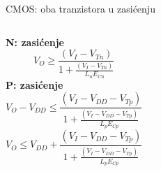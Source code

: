 \begin{frame}[label=09_2-s029]{CMOS: oba tranzistora u zasićenju}
\begin{columns}[T,onlytextwidth]\centering {}\textbf{N: zasićenje}\[ V_O \ge \frac{(V_I-V_{Tn})}{1+\frac{(V_I-V_{Tn})}{L_nE_{Cn}}}\]
\textbf{P: zasićenje}\[ V_O-V_{DD} \le \frac{(V_I-V_{DD}-V_{Tp})}{1+\frac{(V_I-V_{DD}-V_{Tp})}{L_pE_{Cp}}}\]
\[V_O \le V_{DD}+\frac{(V_I-V_{DD}-V_{Tp})}{1+\frac{(V_I-V_{DD}-V_{Tp})}{L_pE_{Cp}}}\]
\end{columns}
\end{frame}
